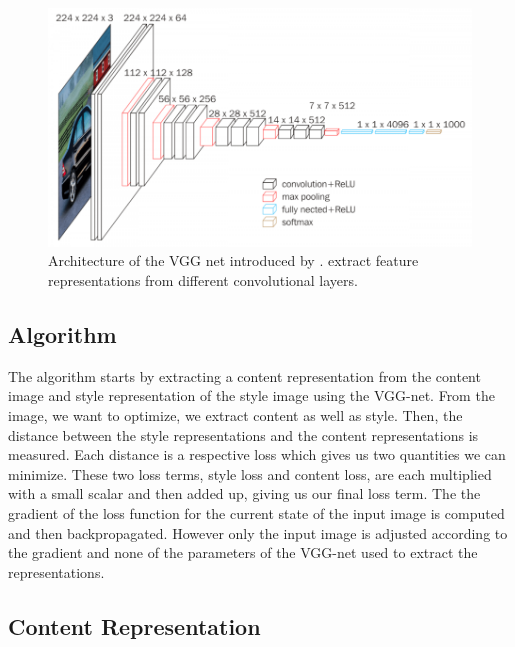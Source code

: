 \documentclass{seminar}
\begin{document}
\begin{figure} %
	\centering
	\includegraphics[scale=0.37]{vgg16.png}
	\caption{Architecture of the VGG net introduced by \cite{simonyan2014very}. \cite{gatys2015neural} extract feature representations from different convolutional layers.}
	\label{fig:vgg}
\end{figure}

\subsection{Algorithm}
The algorithm starts by extracting a content representation from the content image and style representation of the style image using the VGG-net. From the image, we want to optimize, we extract content as well as style. Then, the distance between the style representations and the content representations is measured. Each distance is a respective loss which gives us two quantities we can minimize. These two loss terms, style loss and content loss, are each multiplied with a small scalar and then added up, giving us our final loss term. The the gradient of the loss function for the current state of the input image is computed and then backpropagated. However only the input image is adjusted according to the gradient and none of the parameters of the VGG-net used to extract the representations.


\subsection{Content Representation}
\end{document}
